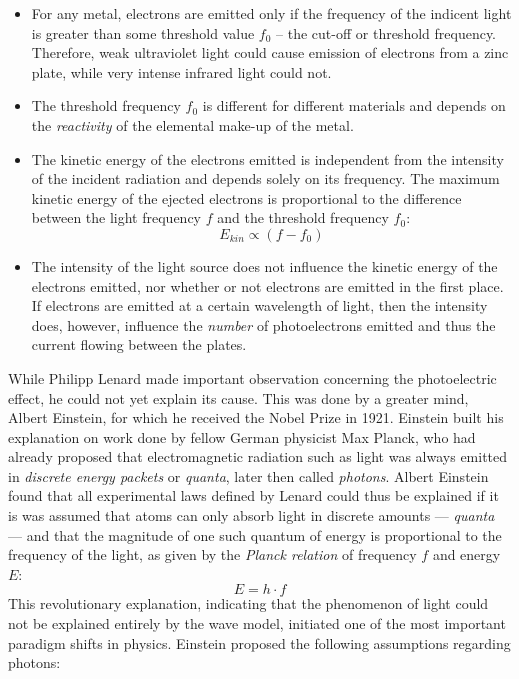 \begin{itemize}
	
	\item For any metal, electrons are emitted only if the frequency of the indicent light is greater than some threshold value $f_0$ -- the cut-off or threshold frequency. Therefore, weak ultraviolet light could cause emission of electrons from a zinc plate, while very intense infrared light could not.

	\item The threshold frequency $f_0$ is different for different materials and depends on the \emph{reactivity} of the elemental make-up of the metal.

	\item The kinetic energy of the electrons emitted is independent from the intensity of the incident radiation and depends solely on its frequency. The maximum kinetic energy of the ejected electrons is proportional to the difference between the light frequency $f$ and the threshold frequency $f_0$: $$E_{kin} \propto (f - f_0)$$

	\item The intensity of the light source does not influence the kinetic energy of the electrons emitted, nor whether or not electrons are emitted in the first place. If electrons are emitted at a certain wavelength of light, then the intensity does, however, influence the \emph{number} of photoelectrons emitted and thus the current flowing between the plates.

\end{itemize}

While Philipp Lenard made important observation concerning the photoelectric effect, he could not yet explain its cause. This was done by a greater mind, Albert Einstein, for which he received the Nobel Prize in 1921. Einstein built his explanation on work done by fellow German physicist Max Planck, who had already proposed that electromagnetic radiation such as light was always emitted in \emph{discrete energy packets} or \emph{quanta}, later then called \emph{photons}. Albert Einstein found that all experimental laws defined by Lenard could thus be explained if it is was assumed that atoms can only absorb light in discrete amounts --- \emph{quanta} --- and that the magnitude of one such quantum of energy is proportional to the frequency of the light, as given by the \emph{Planck relation} of frequency $f$ and energy $E$: $$E = h \cdot f$$ This revolutionary explanation, indicating that the phenomenon of light could not be explained entirely by the wave model, initiated one of the most important paradigm shifts in physics. Einstein proposed the following assumptions regarding photons:

